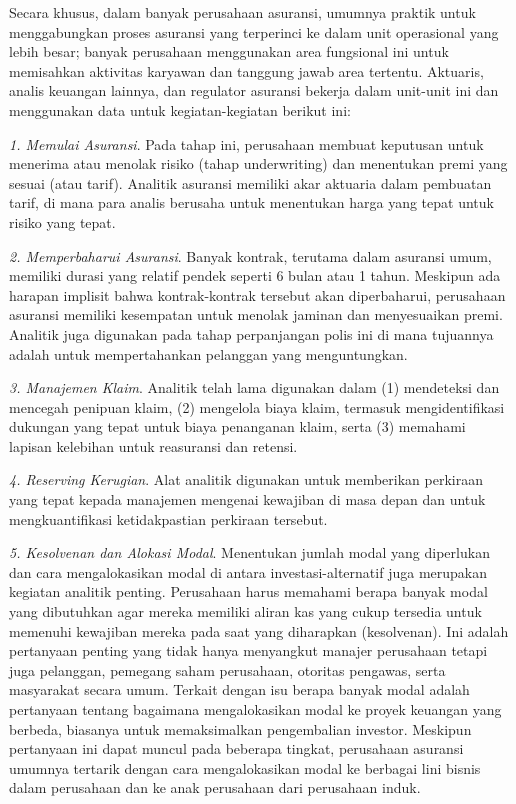 \documentclass[
]{book}
\begin{document}
Secara khusus, dalam banyak perusahaan asuransi, umumnya praktik untuk menggabungkan proses asuransi yang terperinci ke dalam unit operasional yang lebih besar; banyak perusahaan menggunakan area fungsional ini untuk memisahkan aktivitas karyawan dan tanggung jawab area tertentu. Aktuaris, analis keuangan lainnya, dan regulator asuransi bekerja dalam unit-unit ini dan menggunakan data untuk kegiatan-kegiatan berikut ini:

\emph{1. Memulai Asuransi}. Pada tahap ini, perusahaan membuat keputusan untuk menerima atau menolak risiko (tahap underwriting) dan menentukan premi yang sesuai (atau tarif). Analitik asuransi memiliki akar aktuaria dalam pembuatan tarif, di mana para analis berusaha untuk menentukan harga yang tepat untuk risiko yang tepat.

\emph{2. Memperbaharui Asuransi}. Banyak kontrak, terutama dalam asuransi umum, memiliki durasi yang relatif pendek seperti 6 bulan atau 1 tahun. Meskipun ada harapan implisit bahwa kontrak-kontrak tersebut akan diperbaharui, perusahaan asuransi memiliki kesempatan untuk menolak jaminan dan menyesuaikan premi. Analitik juga digunakan pada tahap perpanjangan polis ini di mana tujuannya adalah untuk mempertahankan pelanggan yang menguntungkan.

\emph{3. Manajemen Klaim}. Analitik telah lama digunakan dalam (1) mendeteksi dan mencegah penipuan klaim, (2) mengelola biaya klaim, termasuk mengidentifikasi dukungan yang tepat untuk biaya penanganan klaim, serta (3) memahami lapisan kelebihan untuk reasuransi dan retensi.

\emph{4. Reserving Kerugian}. Alat analitik digunakan untuk memberikan perkiraan yang tepat kepada manajemen mengenai kewajiban di masa depan dan untuk mengkuantifikasi ketidakpastian perkiraan tersebut.

\emph{5. Kesolvenan dan Alokasi Modal}. Menentukan jumlah modal yang diperlukan dan cara mengalokasikan modal di antara investasi-alternatif juga merupakan kegiatan analitik penting. Perusahaan harus memahami berapa banyak modal yang dibutuhkan agar mereka memiliki aliran kas yang cukup tersedia untuk memenuhi kewajiban mereka pada saat yang diharapkan (kesolvenan). Ini adalah pertanyaan penting yang tidak hanya menyangkut manajer perusahaan tetapi juga pelanggan, pemegang saham perusahaan, otoritas pengawas, serta masyarakat secara umum. Terkait dengan isu berapa banyak modal adalah pertanyaan tentang bagaimana mengalokasikan modal ke proyek keuangan yang berbeda, biasanya untuk memaksimalkan pengembalian investor. Meskipun pertanyaan ini dapat muncul pada beberapa tingkat, perusahaan asuransi umumnya tertarik dengan cara mengalokasikan modal ke berbagai lini bisnis dalam perusahaan dan ke anak perusahaan dari perusahaan induk.
\end{document}
